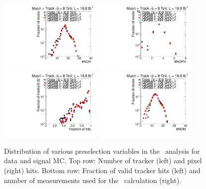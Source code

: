 \begin{figure}
\centering
  \includegraphics[clip=true, trim=0.0cm 0cm 2.8cm 0cm, width=0.44\textwidth]{figures/tkmu/Selection_Comp_8TeV_GMStau_NOH_BS}
  \includegraphics[clip=true, trim=0.0cm 0cm 2.8cm 0cm, width=0.44\textwidth]{figures/tkmu/Selection_Comp_8TeV_GMStau_NOPH_BS} \\
  \includegraphics[clip=true, trim=0.0cm 0cm 2.8cm 0cm, width=0.44\textwidth]{figures/tkmu/Selection_Comp_8TeV_GMStau_NOHFraction_BS}
  \includegraphics[clip=true, trim=0.0cm 0cm 2.8cm 0cm, width=0.44\textwidth]{figures/tkmu/Selection_Comp_8TeV_GMStau_NOM_BS}
  \caption[Distribution of number of tracker and pixel hits, fraction of valid tracker hits, and number of \dedx\ measurements in the \tktof\ analysis for data and signal MC.]
{Distribution of various preselection variables in the \tktof\ analysis for data and signal MC.
Top row: Number of tracker (left) and pixel (right) hits.
Bottom row: Fraction of valid tracker hits (left) and number of measurements used for the \dedx\ calculation (right).}
    \label{fig:TkMuPreselA}
\end{figure}

